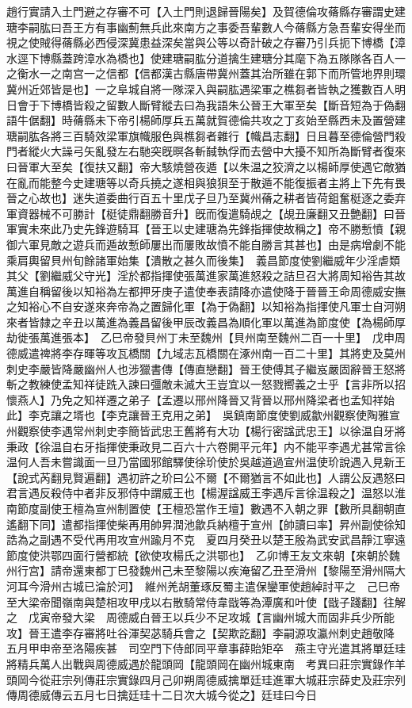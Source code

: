 趙行實請入土門避之存審不可【入土門則退歸晉陽矣】及賀德倫攻蓨縣存審謂史建瑭李嗣肱曰吾王方有事幽薊無兵此來南方之事委吾輩數人今蓨縣方急吾輩安得坐而視之使賊得蓨縣必西侵深冀患益深矣當與公等以奇計破之存審乃引兵扼下博橋【漳水逕下博縣蓋跨漳水為橋也】使建瑭嗣肱分道擒生建瑭分其麾下為五隊隊各百人一之衡水一之南宫一之信都【信都漢古縣唐帶冀州蓋其治所雖在郭下而所管地界則環冀州近郊皆是也】一之阜城自將一隊深入與嗣肱遇梁軍之樵芻者皆執之獲數百人明日會于下博橋皆殺之留數人斷臂縱去曰為我語朱公晉王大軍至矣【斷音短為于偽翻語牛倨翻】時蓨縣未下帝引楊師厚兵五萬就賀德倫共攻之丁亥始至縣西未及置營建瑭嗣肱各將三百騎效梁軍旗幟服色與樵芻者雜行【幟昌志翻】日且暮至德倫營門殺門者縱火大譟弓矢亂發左右馳突旣暝各斬馘執俘而去營中大擾不知所為斷臂者復來曰晉軍大至矣【復扶又翻】帝大駭燒營夜遁【以朱温之狡濟之以楊師厚使遇它敵猶在亂而能整今史建瑭等以奇兵撓之遂相與狼狽至于散遁不能復振者主將上下先有畏晉之心故也】迷失道委曲行百五十里戊子旦乃至冀州蓨之耕者皆荷鉏奮梃逐之委弃軍資器械不可勝計【梃徒鼎翻勝音升】旣而復遣騎覘之【覘丑廉翻又丑艶翻】曰晉軍實未來此乃史先鋒遊騎耳【晉王以史建瑭為先鋒指揮使故稱之】帝不勝慙憤【親御六軍見敵之遊兵而遁故慙師屢出而屢敗故憤不能自勝言其甚也】由是病增劇不能乘肩輿留貝州旬餘諸軍始集【潰散之甚久而後集】　義昌節度使劉繼威年少淫虐類其父【劉繼威父守光】淫於都指揮使張萬進家萬進怒殺之詰旦召大將周知裕告其故萬進自稱留後以知裕為左都押牙庚子遣使奉表請降亦遣使降于晉晉王命周德威安撫之知裕心不自安遂來奔帝為之置歸化軍【為于偽翻】以知裕為指揮使凡軍士自河朔來者皆隸之辛丑以萬進為義昌留後甲辰改義昌為順化軍以萬進為節度使【為楊師厚劫徙張萬進張本】　乙巳帝發貝州丁未至魏州【貝州南至魏州二百一十里】　戊申周德威遣禆將李存暉等攻瓦橋關【九域志瓦橋關在涿州南一百二十里】其將吏及莫州刺史李嚴皆降嚴幽州人也涉獵書傳【傳直戀翻】晉王使傅其子繼岌嚴固辭晉王怒將斬之教練使孟知祥徒跣入諫曰彊敵未滅大王豈宜以一怒戮嚮義之士乎【言非所以招懷燕人】乃免之知祥遷之弟子【孟遷以邢州降晉又背晉以邢州降梁者也孟知祥始此】李克讓之壻也【李克讓晉王克用之弟】　吳鎮南節度使劉威歙州觀察使陶雅宣州觀察使李遇常州刺史李簡皆武忠王舊將有大功【楊行密諡武忠王】以徐温自牙將秉政【徐温自右牙指揮使秉政見二百六十六卷開平元年】内不能平李遇尤甚常言徐温何人吾未嘗識面一旦乃當國邪館驛使徐玠使於吳越道過宣州温使玠說遇入見新王【說式芮翻見賢遍翻】遇初許之玠曰公不爾【不爾猶言不如此也】人謂公反遇怒曰君言遇反殺侍中者非反邪侍中謂威王也【楊渥諡威王李遇斥言徐温殺之】温怒以淮南節度副使王檀為宣州制置使【王檀恐當作王壇】數遇不入朝之罪【數所具翻朝直遙翻下同】遣都指揮使柴再用帥昇潤池歙兵納檀于宣州【帥讀曰率】昇州副使徐知誥為之副遇不受代再用攻宣州踰月不克　夏四月癸丑以楚王殷為武安武昌靜江寧遠節度使洪鄂四面行營都統【欲使攻楊氏之洪鄂也】　乙卯博王友文來朝【來朝於魏州行宫】請帝還東都丁巳發魏州己未至黎陽以疾淹留乙丑至滑州【黎陽至滑州隔大河耳今滑州古城已淪於河】　維州羌胡董琢反蜀主遣保鑾軍使趙綽討平之　己巳帝至大梁帝聞嶺南與楚相攻甲戌以右散騎常侍韋戩等為潭廣和叶使【戩子踐翻】往解之　戊寅帝發大梁　周德威白晉王以兵少不足攻城【言幽州城大而固非兵少所能攻】晉王遣李存審將吐谷渾契苾騎兵會之【契欺訖翻】李嗣源攻瀛州刺史趙敬降　五月甲申帝至洛陽疾甚　司空門下侍郎同平章事薛貽矩卒　燕主守光遣其將單廷珪將精兵萬人出戰與周德威遇於龍頭岡【龍頭岡在幽州城東南　考異曰莊宗實錄作羊頭岡今從莊宗列傳莊宗實錄四月己卯朔周德威擒單廷珪進軍大城莊宗薛史及莊宗列傳周德威傳云五月七日擒廷珪十二日次大城今從之】廷珪曰今日